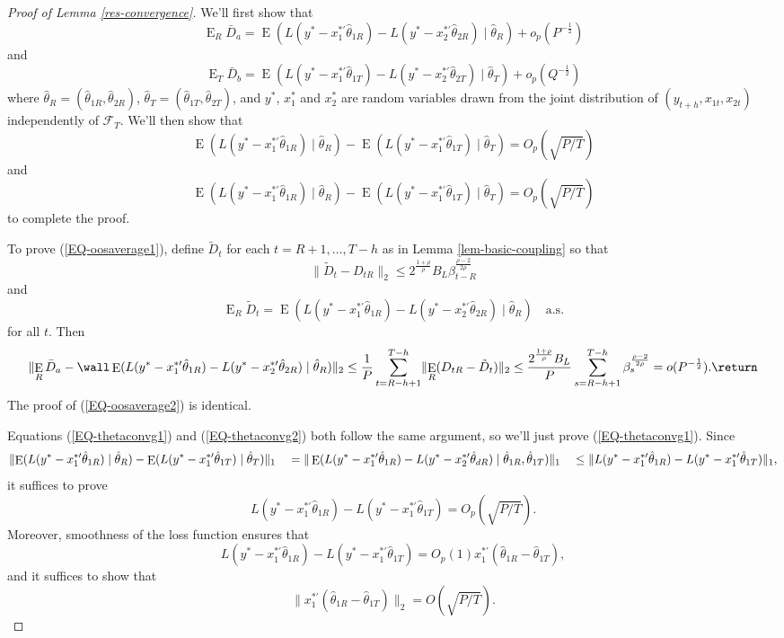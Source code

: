 \documentclass[11pt]{article}
\DeclareMathOperator{\E}{E}
\newcommand{\oosA}{\bar{D}_a}
\newcommand{\oosB}{\bar{D}_b}
\newcommand{\oosSum}[2]{\ensuremath{\sum_{#1=R-\h+#2}^{T-\h}}}
\newcommand{\h}{h}
\newcommand{\couplingConstant}{\ensuremath{2^{\frac{1+\rho}{\rho}} B_L}}
\newcommand{\couplingBeta}[1]{\ensuremath{\beta^{\frac{\rho-2}{2\rho}}_{#1}}}
\newcommand{\couplingBound}[1]{\couplingConstant \couplingBeta{#1}}
\newcommand{\bh}[1]{\ensuremath{\hat\theta_{#1}}}
\begin{document}
\begin{proof}[Proof of Lemma \ref{res-convergence}]
\newcommand{\resConvgRHS}[1]{\ensuremath{\E(L(y^* - x_1^{*\prime}\bh{1#1}) - L(y^{*} -
x_2^{*\prime}\bh{2#1}) \mid \bh{#1})}}
\newcommand{\resConvgEstDiff}[1]{\ensuremath{\E(L(y^{*} -
    x_{#1}^{*\prime}\bh{#1R}) \mid \bh{R}) - 
\E(L(y^{*} - x_{#1}^{*\prime}\bh{#1T}) \mid \bh{T})}}
\newcommand{\resConvgEstDiffRV}[1]{\ensuremath{L(y^{*} -
    x_{#1}^{*\prime}\bh{#1R}) - L(y^{*} - x_{#1}^{*\prime}\bh{#1T})}}
We'll first show that 
\begin{equation}\label{EQ-oosaverage1}
\E_R \oosA = \resConvgRHS{R} + o_p(P^{-\frac12})
\end{equation}
and
\begin{equation}\label{EQ-oosaverage2}
\E_T \oosB = \resConvgRHS{T} + o_p(Q^{-\frac12})
\end{equation}
where $\hat\theta_R = (\hat\theta_{1R}, \hat\theta_{2R})$,
$\hat\theta_T = (\hat\theta_{1T}, \hat\theta_{2T})$, and $y^{*}$,
$x_1^{*}$ and $x_2^{*}$ are random variables drawn from the joint
distribution of $(y_{t+\h},x_{1t},x_{2t})$ independently of
$\mathcal{F}_T$.  We'll then show that
\begin{equation}\label{EQ-thetaconvg1}
\resConvgEstDiff{1} = O_p(\sqrt{P/T})
\end{equation}
and
\begin{equation}\label{EQ-thetaconvg2}
\resConvgEstDiff{1} = O_p(\sqrt{P/T})
\end{equation}
to complete the proof.

To prove (\ref{EQ-oosaverage1}), define $\tilde D_t$ for each $t = R+1,\dots,T-\h$ as
in Lemma \ref{lem-basic-coupling} so that
\[
\lVert \tilde D_t - D_{tR} \rVert_2 \leq \couplingBound{t-R}
\]
and 
\[
\E_R \tilde D_t = \resConvgRHS{R} \quad\text{a.s.}
\]
for all $t$.  Then 
\[
\lVert \E_R \oosA - \wall \resConvgRHS{R} \rVert_2  \\
\leq \frac1P \oosSum{t}{1} \lVert \E_R (D_{tR} - \tilde D_t) \rVert_2 \\
\leq \frac{\couplingConstant}{P} \oosSum{s}{1} \couplingBeta{s} \\
= o(P^{-\frac12}).
\return
\]
The proof of (\ref{EQ-oosaverage2}) is identical.

Equations (\ref{EQ-thetaconvg1}) and (\ref{EQ-thetaconvg2}) both
follow the same argument, so we'll just prove (\ref{EQ-thetaconvg1}).
Since 
\[ \lVert \resConvgEstDiff{1} \rVert_1 \\ \quad= \| \E(L(y^{*} -
x_1^{*\prime} \hat{\theta}_{1R}) - L(y^{*} - x_2^{*\prime}
\hat{\theta}_{dR}) \mid \hat{\theta}_{1R}, \hat{\theta}_{1T}) \|_1 \\
\quad\leq \lVert \resConvgEstDiffRV{1} \rVert_1, \] it suffices to
prove
\[ \resConvgEstDiffRV{1} = O_p(\sqrt{P/T}). \]
Moreover, smoothness of the loss function ensures that
\[ \resConvgEstDiffRV{1} = O_p(1) x_1^{*\prime} (\bh{1R} -
\bh{1T}), \]
and it suffices to show that
\begin{equation*}
  \lVert x_1^{*\prime}(\bh{1R} - \bh{1T}) \rVert_2 = O(\sqrt{P/T}).
\end{equation*}


\end{proof}
\end{document}
